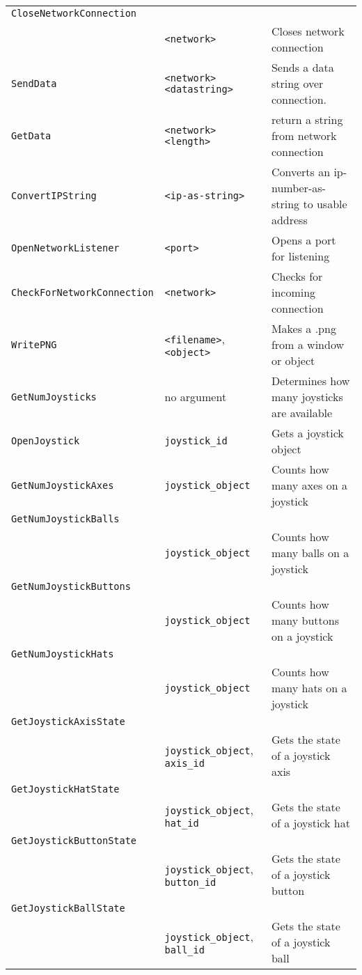 \begin{longtable}{p{3cm}p{3cm}p{6cm}}
\verb+CloseNetworkConnection+& &\\
& \verb+<network>+& Closes network connection\\
\verb+SendData+&\verb+<network>+ \verb+<datastring>+&  Sends a data string over connection.\\
\verb+GetData+&\verb+<network>+ \verb+<length>+&return a string from network connection\\
\verb+ConvertIPString+&\verb+<ip-as-string>+&Converts an
ip-number-as-string to usable address \\
\verb+OpenNetworkListener+&\verb+<port>+&Opens a port for listening\\
\verb+CheckForNetworkConnection+&\verb+<network>+&Checks for incoming connection\\
\verb+WritePNG+&\verb+<filename>+, \verb+<object>+ &Makes a .png from a window or object\\

\verb+GetNumJoysticks+& no argument&Determines how many joysticks are available\\
\verb+OpenJoystick+& \verb+joystick_id+& Gets a joystick object\\
\verb+GetNumJoystickAxes+&\verb+joystick_object+&Counts how many axes on a joystick\\
\verb+GetNumJoystickBalls+\\
 &\verb+joystick_object+&Counts how many balls on a joystick\\
\verb+GetNumJoystickButtons+\\
&\verb+joystick_object+&Counts how many buttons on a joystick\\
\verb+GetNumJoystickHats+\\
&\verb+joystick_object+&Counts how many hats on a joystick\\
\verb+GetJoystickAxisState+\\
&\verb+joystick_object+, \verb+axis_id+&Gets the state of a joystick axis\\
\verb+GetJoystickHatState+\\
&\verb+joystick_object+, \verb+hat_id+&Gets the state of a joystick hat\\
\verb+GetJoystickButtonState+\\
&\verb+joystick_object+, \verb+button_id+&Gets the state of a joystick button\\
\verb+GetJoystickBallState+\\
&\verb+joystick_object+, \verb+ball_id+&Gets the state of a joystick ball\\


\end{longtable}
